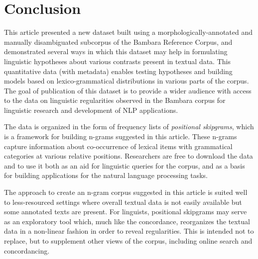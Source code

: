 \documentclass[12pt]{article}
\begin{document}
\section{Conclusion}

This article presented a new dataset built using
a morphologically-annotated and manually disambiguated subcorpus of the
Bambara Reference Corpus, and demonstrated several ways in which this
dataset may help in formulating linguistic hypotheses about various
contrasts present in textual data. This quantitative data (with
metadata) enables testing hypotheses and building models based on
lexico-grammatical distributions in various parts of the corpus.  The
goal of publication of this dataset is to provide a wider audience with
access to the data on linguistic regularities observed in the Bambara
corpus for linguistic research and development of NLP
applications.

The data is organized in the form of frequency lists of
\textit{positional skipgrams}, which is a framework for building
n-grams suggested in this article. These n-grams capture information
about co-occurrence of lexical items with grammatical categories at
various relative positions. Researchers are free to download the data
and to use it both as an aid for linguistic queries for the corpus,
and as a basis for building applications for the natural language
processing tasks.


The approach to create an n-gram corpus suggested in this article is
suited well to less-resourced settings where overall textual data is
not easily available but some annotated texts are present. For
linguists, positional skipgrams may serve as an exploratory tool
which, much like the concordance, reorganizes the textual data in a
non-linear fashion in order to reveal regularities. This is intended
not to replace, but to supplement other views of the corpus, including
online search and concordancing.


\printbibliography{}
\end{document}
